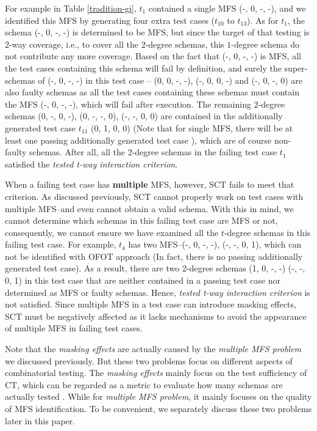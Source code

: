 \documentclass[10pt,journal,compsoc]{IEEEtran}
\begin{document}
For example in Table \ref{tradition-gi}, $t_{1}$ contained a single MFS (-, 0, -, -), and we identified this MFS by generating four extra test cases ($t_{10}$ to $t_{13}$). As for $t_{1}$, the schema (-, 0, -, -) is determined to be MFS, but since the target of that testing is $2$-way coverage, i.e., to cover all the 2-degree schemas, this $1$-degree schema do not contribute any more coverage. Based on the fact that (-, 0, -, -) is MFS, all the test cases containing this schema will fail by definition, and surely the super-schemas of (-, 0, -, -) in this test case -- (0, 0, -, -), (-, 0, 0, -) and (-, 0, -, 0) are also faulty schemas as all the test cases containing these schemas must contain the MFS (-, 0, -, -), which will fail after execution. The remaining 2-degree schemas (0, -, 0, -), (0, -, -, 0), (-, -, 0, 0) are contained in the additionally generated test case $t_{11}$ (0, 1, 0, 0) (Note that for single MFS, there will be at least one passing additionally generated test case ), which are of course non-faulty schemas.  After all, all the 2-degree schemas in the failing test case $t_{1}$ satisfied the \emph{tested t-way interaction criterion}.

When a failing test case has \textbf{multiple} MFS, however, SCT fails to meet that criterion. As discussed previously, SCT cannot properly work on test cases with multiple MFS--and even cannot obtain a valid schema. With this in mind, we cannot determine which schemas in this failing test case are MFS or not, consequently, we cannot ensure we have examined all the $t$-degree schemas in this failing test case. For example, $t_{4}$ has two MFS--(-, 0, -, -), (-, -, 0, 1), which can not be identified with OFOT approach (In fact, there is no passing additionally generated test case). As a result, there are two 2-degree schemas (1, 0, -, -) (-, -, 0, 1) in this test case that are neither contained in a passing test case nor determined as MFS or faulty schemas.  Hence, \emph{tested t-way interaction criterion} is not satisfied.  Since multiple MFS in a test case can introduce masking effects, SCT must be negatively affected as it lacks mechanisms to avoid the appearance of multiple MFS in failing test cases.

Note that the \emph{masking effects} are actually caused by the \emph{multiple MFS problem} we discussed previously. But these two problems focus on different aspects of combinatorial testing. The \emph{masking effects} mainly focus on the test sufficiency of CT, which can be regarded as a metric to evaluate how many schemas are actually tested \cite{yilmaz2013reducing}. While for \emph{multiple MFS problem}, it mainly focuses on the quality of MFS identification. To be convenient, we separately discuss these two problems later in this paper.
\end{document}
